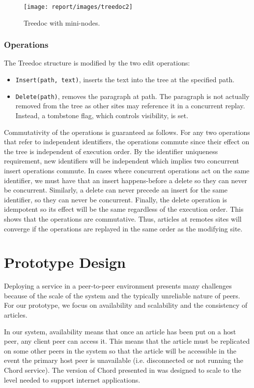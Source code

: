 \documentclass[twocolumn]{article}
\begin{document}
\begin{figure}[tbh!]
  \centering
  \texttt{[image: report/images/treedoc2]}
  \caption{Treedoc with mini-nodes.\label{fig:treedoc_full}}
\end{figure}

\subsubsection{Operations}
The Treedoc structure is modified by the two edit operations:
\begin{itemize}
  \item \texttt{Insert(path, text)}, inserts the text into the tree at the specified path.
  \item \texttt{Delete(path)}, removes the paragraph at path. The paragraph is not actually removed from the tree as other sites may reference it in a concurrent replay. Instead, a tombstone flag, which controls visibility, is set.
\end{itemize}

Commutativity of the operations is guaranteed as follows. For any two operations that refer to independent identifiers, the operations commute since their effect on the tree is independent of execution order. By the identifier uniqueness requirement, new identifiers will be independent which implies two concurrent insert operations commute. In cases where concurrent operations act on the same identifier, we must have that an insert happens-before a delete so they can never be concurrent. Similarly, a delete can never precede an insert for the same identifier, so they can never be concurrent. Finally, the delete operation is idempotent so its effect will be the same regardless of the execution order. This shows that the operations are commutative. Thus, articles at remotes sites will converge if the operations are replayed in the same order as the modifying site.


\section{Prototype Design}
Deploying a service in a peer-to-peer environment presents many challenges because of the scale of the system and the typically unreliable nature of peers. For our prototype, we focus on availability and scalability and the consistency of articles.

In our system, availability means that once an article has been put on a host peer, any client peer can access it. This means that the article must be replicated on some other peers in the system so that the article will be accessible in the event the primary host peer is unavailable (i.e. disconnected or not running the Chord service). The version of Chord presented in \cite{c1} was designed to scale to the level needed to support internet applications.
\end{document}
